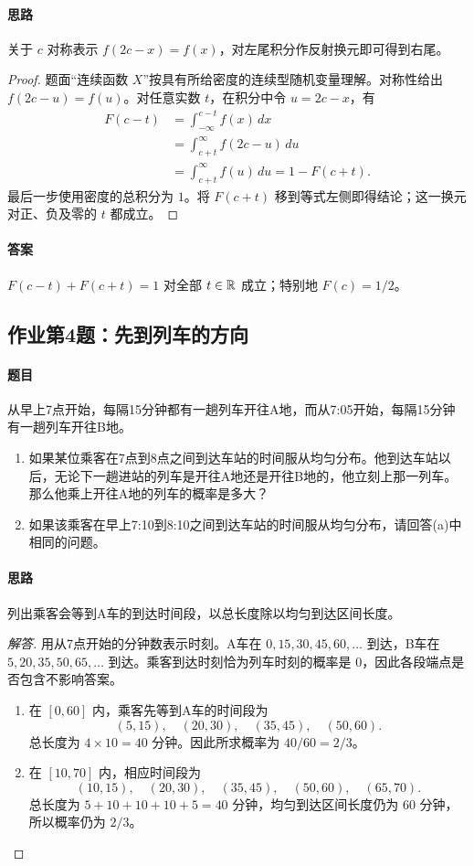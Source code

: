 \paragraph{思路} 关于 $c$ 对称表示 $f(2c-x)=f(x)$，对左尾积分作反射换元即可得到右尾。
\begin{proof}
题面“连续函数 $X$”按具有所给密度的连续型随机变量理解。对称性给出 $f(2c-u)=f(u)$。对任意实数 $t$，在积分中令 $u=2c-x$，有
\begin{align*}
F(c-t)
&=\int_{-\infty}^{c-t}f(x)\,dx\\
&=\int_{c+t}^{\infty}f(2c-u)\,du\\
&=\int_{c+t}^{\infty}f(u)\,du
=1-F(c+t).
\end{align*}
最后一步使用密度的总积分为 $1$。将 $F(c+t)$ 移到等式左侧即得结论；这一换元对正、负及零的 $t$ 都成立。
\end{proof}
\paragraph{答案} $F(c-t)+F(c+t)=1$ 对全部 $t\in\mathbb R$ 成立；特别地 $F(c)=1/2$。

\subsection{作业第4题：先到列车的方向}\label{ex:w08-h4}
\paragraph{题目}
从早上7点开始，每隔15分钟都有一趟列车开往A地，而从7:05开始，每隔15分钟有一趟列车开往B地。
\begin{enumerate}
\item 如果某位乘客在7点到8点之间到达车站的时间服从均匀分布。他到达车站以后，无论下一趟进站的列车是开往A地还是开往B地的，他立刻上那一列车。那么他乘上开往A地的列车的概率是多大？
\item 如果该乘客在早上7:10到8:10之间到达车站的时间服从均匀分布，请回答(a)中相同的问题。
\end{enumerate}
\paragraph{思路} 列出乘客会等到A车的到达时间段，以总长度除以均匀到达区间长度。
\begin{proof}[解答]
用从7点开始的分钟数表示时刻。A车在 $0,15,30,45,60,\ldots$ 到达，B车在 $5,20,35,50,65,\ldots$ 到达。乘客到达时刻恰为列车时刻的概率是 $0$，因此各段端点是否包含不影响答案。
\begin{enumerate}
\item 在 $[0,60]$ 内，乘客先等到A车的时间段为
\[
(5,15),\quad(20,30),\quad(35,45),\quad(50,60).
\]
总长度为 $4\times10=40$ 分钟。因此所求概率为 $40/60=2/3$。
\item 在 $[10,70]$ 内，相应时间段为
\[
(10,15),\quad(20,30),\quad(35,45),\quad(50,60),\quad(65,70).
\]
总长度为 $5+10+10+10+5=40$ 分钟，均匀到达区间长度仍为 $60$ 分钟，所以概率仍为 $2/3$。
\end{enumerate}
\end{proof}
